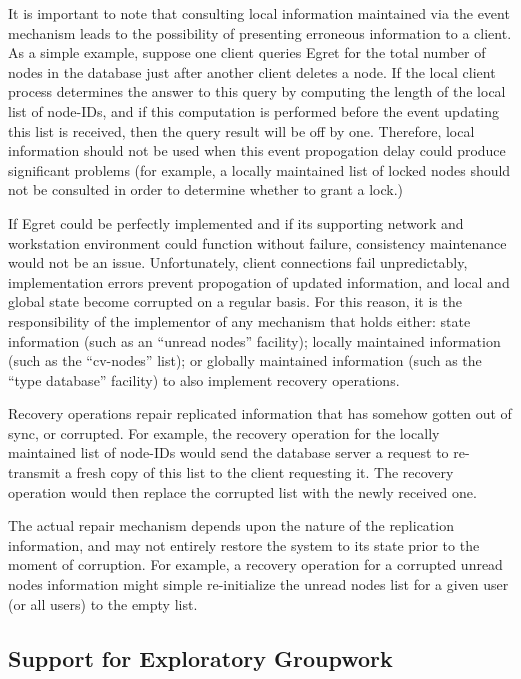 It is important to note that consulting local information maintained
via the event mechanism leads to the possibility of presenting
erroneous information to a client.  As a simple example, suppose one
client queries Egret  for the total number of nodes in the database
just after another client deletes a node. If the local
client process determines the answer to this query by computing the length of the
local list of node-IDs, and if this computation is performed before the
event updating this list is received, then the query result will be
off by one.  Therefore, local information should not be used when this
event propogation delay could produce significant problems (for
example, a locally maintained list of locked nodes should not be
consulted in order to determine whether to grant a lock.)
 
If Egret  could be perfectly implemented and if its supporting
network and workstation environment could function without failure,
consistency maintenance would not be an issue.  Unfortunately, client
connections fail unpredictably, implementation errors prevent
propogation of updated information, and local and global state become
corrupted on a regular basis.  For this reason, it is the
responsibility of the implementor of any mechanism that holds either: state
information (such as an ``unread nodes'' facility); locally maintained
information (such as the ``cv-nodes'' list);  or globally maintained
information (such as the ``type database'' facility) to also implement
recovery operations.

Recovery operations repair replicated information that
has somehow gotten out of sync, or corrupted. For example, the 
recovery operation for the locally maintained list of node-IDs would
send the database server a request to re-transmit a fresh copy of this list
to the client requesting it.  The recovery operation would then replace
the corrupted list with the newly received one. 

The actual repair mechanism depends upon the nature of the replication
information, and may not entirely restore the system to its state
prior to the moment of corruption. For example, a recovery operation
for a corrupted unread nodes information might simple re-initialize
the unread nodes list for a given user (or all users) to the empty
list. 

\subsection{Support for Exploratory Groupwork}

